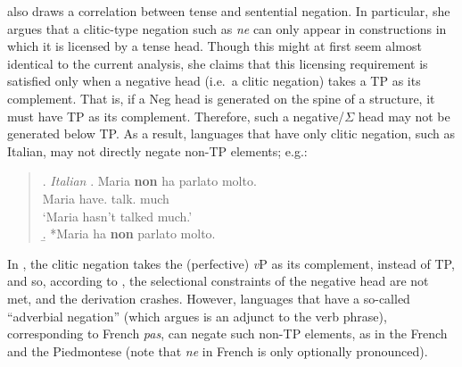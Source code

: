 \citet{zanuttini1996} also draws a correlation between tense and sentential negation. In particular, she argues that a clitic-type negation such as {\it ne} can only appear in constructions in which it is licensed by a tense head. Though this might at first seem almost identical to the current analysis, she claims that this licensing requirement is satisfied only when a negative head (i.e.\ a clitic negation) takes a TP as its complement. That is, if a Neg head is generated on the spine of a structure, it must have TP as its complement. Therefore, such a negative/$\Sigma$ head may not be generated below TP. As a result, languages that have only clitic negation, such as Italian, may not directly negate non-TP elements; e.g.:

\singlespacing
\begin{quote}
\ex. {\it Italian}\label{It_neg_ex}
\ag. Maria \textbf{non} ha parlato molto.\\
Maria \mbox{} have.\mbox{} talk.\mbox{} much\\
`Maria hasn't talked much.'\\
\b. *Maria ha \textbf{non} parlato molto.

\end{quote}
\onehalfspacing
In \Last[b], the clitic negation takes the (perfective) {\it v}P as its complement, instead of TP, and so, according to \citeauthor{zanuttini1996}, the selectional constraints of the negative head are not met, and the derivation crashes. However, languages that have a so-called ``adverbial negation'' (which \citeauthor{zanuttini1996} argues is an adjunct to the verb phrase), corresponding to French {\it pas}, can negate such non-TP elements, as in the French \Next and the Piedmontese \NNext (note that {\it ne} in French is only optionally pronounced).

